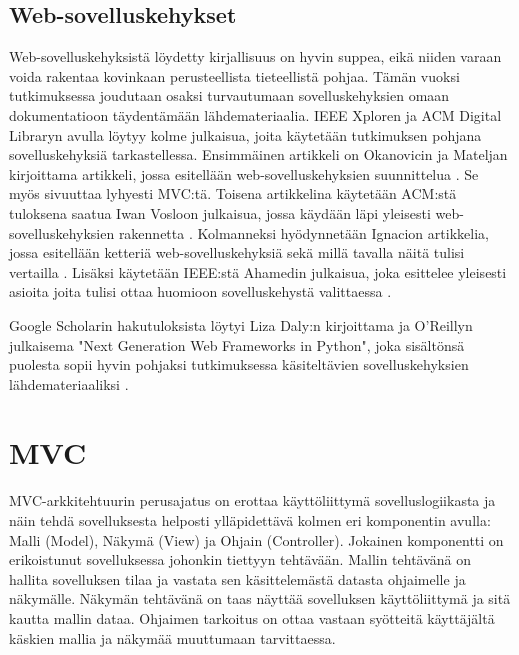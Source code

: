 \documentclass[utf8]{gradu3}
\begin{document}
\section{Web-sovelluskehykset}
Web-sovelluskehyksistä löydetty kirjallisuus on hyvin
suppea, eikä niiden varaan voida rakentaa kovinkaan perusteellista
tieteellistä pohjaa. Tämän vuoksi tutkimuksessa joudutaan osaksi turvautumaan
sovelluskehyksien omaan dokumentatioon täydentämään
lähdemateriaalia. IEEE Xploren ja ACM Digital Libraryn avulla löytyy kolme julkaisua, 
joita käytetään tutkimuksen pohjana sovelluskehyksiä
tarkastellessa. Ensimmäinen artikkeli on Okanovicin ja Mateljan
kirjoittama artikkeli, jossa esitellään web-sovelluskehyksien suunnittelua \parencite{ockanovic}. 
Se myös sivuuttaa lyhyesti MVC:tä. Toisena artikkelina käytetään ACM:stä tuloksena saatua Iwan
Vosloon julkaisua, jossa käydään läpi yleisesti web-sovelluskehyksien
rakennetta \parencite{vosloo}. Kolmanneksi hyödynnetään Ignacion artikkelia, jossa esitellään ketteriä
web-sovelluskehyksiä sekä millä tavalla näitä tulisi vertailla \parencite{ignacio}. Lisäksi käytetään
IEEE:stä Ahamedin julkaisua, joka esittelee yleisesti asioita joita tulisi ottaa huomioon sovelluskehystä 
valittaessa \parencite{towards_framework}.

Google Scholarin hakutuloksista löytyi Liza Daly:n
kirjoittama ja O'Reillyn julkaisema "Next Generation Web Frameworks
in Python", joka sisältönsä puolesta sopii hyvin pohjaksi
tutkimuksessa käsiteltävien sovelluskehyksien lähdemateriaaliksi 
\parencite{liza}.

\chapter{MVC}
MVC-arkkitehtuurin perusajatus on erottaa käyttöliittymä sovelluslogiikasta ja
näin tehdä sovelluksesta helposti ylläpidettävä kolmen eri komponentin avulla:
Malli (Model), Näkymä (View) ja Ohjain (Controller). Jokainen komponentti on
erikoistunut sovelluksessa johonkin tiettyyn tehtävään. Mallin tehtävänä on
hallita sovelluksen tilaa ja vastata sen käsittelemästä datasta ohjaimelle ja näkymälle.
Näkymän tehtävänä on taas näyttää sovelluksen käyttöliittymä ja sitä kautta mallin dataa. 
Ohjaimen tarkoitus on ottaa vastaan syötteitä käyttäjältä käskien mallia ja näkymää muuttumaan tarvittaessa.
\end{document}
